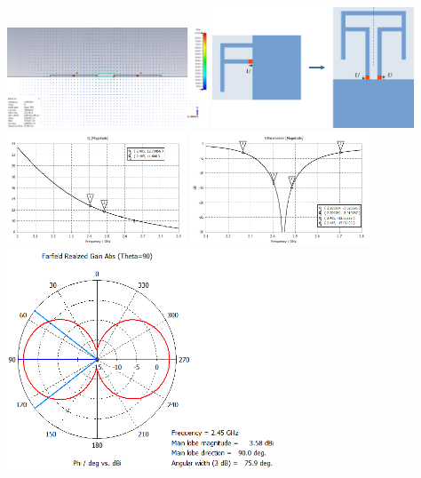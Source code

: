 \documentclass[aspectratio=43]{beamer}
\begin{document}
\begin{frame}
	\centering
		\begin{columns}
		\centering
				\centering
				\includegraphics[width=0.45\textwidth]{e1_2.png}
				\includegraphics[width=0.45\textwidth]{ifa-bifa.pdf}
				\includegraphics[width=0.4\textwidth]{bifa_broadband_QZ.png}
				\includegraphics[width=0.4\textwidth]{bifa_broadband_S11_dB.png}
				\includegraphics[width=0.6\textwidth]{bifa_broadband_pattern_theta90.png}

\end{columns}
\end{frame}
\end{document}
